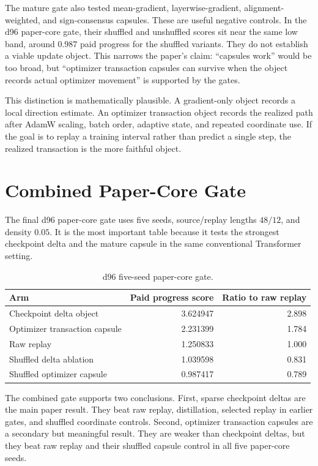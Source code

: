 \documentclass{article}
\begin{document}
The mature gate also tested mean-gradient, layerwise-gradient,
alignment-weighted, and sign-consensus capsules. These are useful negative
controls. In the d96 paper-core gate, their shuffled and unshuffled scores sit
near the same low band, around $0.987$ paid progress for the shuffled variants.
They do not establish a viable update object. This narrows the paper's claim:
``capsules work'' would be too broad, but ``optimizer transaction capsules can
survive when the object records actual optimizer movement'' is supported by the
gates.

This distinction is mathematically plausible. A gradient-only object records a
local direction estimate. An optimizer transaction object records the realized
path after AdamW scaling, batch order, adaptive state, and repeated coordinate
use. If the goal is to replay a training interval rather than predict a single
step, the realized transaction is the more faithful object.

\section{Combined Paper-Core Gate}

The final d96 paper-core gate uses five seeds, source/replay lengths $48/12$,
and density $0.05$. It is the most important table because it tests the
strongest checkpoint delta and the mature capsule in the same conventional
Transformer setting.

\begin{table}[t]
  \centering
  \caption{d96 five-seed paper-core gate.}
  \label{tab:paper_core}
  \begin{tabular}{lrr}
    \toprule
    Arm & Paid progress score & Ratio to raw replay \\
    \midrule
    Checkpoint delta object & 3.624947 & 2.898 \\
    Optimizer transaction capsule & 2.231399 & 1.784 \\
    Raw replay & 1.250833 & 1.000 \\
    Shuffled delta ablation & 1.039598 & 0.831 \\
    Shuffled optimizer capsule & 0.987417 & 0.789 \\
    \bottomrule
  \end{tabular}
\end{table}

The combined gate supports two conclusions. First, sparse checkpoint deltas are
the main paper result. They beat raw replay, distillation, selected replay in
earlier gates, and shuffled coordinate controls. Second, optimizer transaction
capsules are a secondary but meaningful result. They are weaker than checkpoint
deltas, but they beat raw replay and their shuffled capsule control in all five
paper-core seeds.
\end{document}
